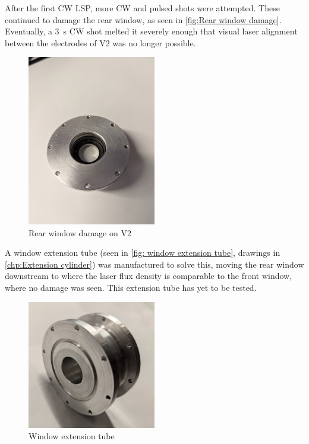 After the first CW LSP, more CW and pulsed shots were attempted. These continued to damage the rear window, as seen in \autoref{fig:Rear window damage}. Eventually, a \qty{3}{s} CW shot melted it severely enough that visual laser alignment between the electrodes of V2 was no longer possible.
\begin{figure}[!ht]
    \centering
    \includegraphics[width=0.5\textwidth]{assets/4 experiments/window damage.jpg}
    \caption{Rear window damage on V2}
    \label{fig:Rear window damage}
\end{figure}
A window extension tube (seen in \autoref{fig: window extension tube}, drawings in \autoref{chp:Extension cylinder}) was manufactured to solve this, moving the rear window downstream to where the laser flux density is comparable to the front window, where no damage was seen. This extension tube has yet to be tested.
\begin{figure}[!ht]
    \centering
    \includegraphics[width=0.5\textwidth]{assets/5 discussion/Extension cylinder.jpg}
    \caption{Window extension tube}
    \label{fig: window extension tube}
\end{figure}

